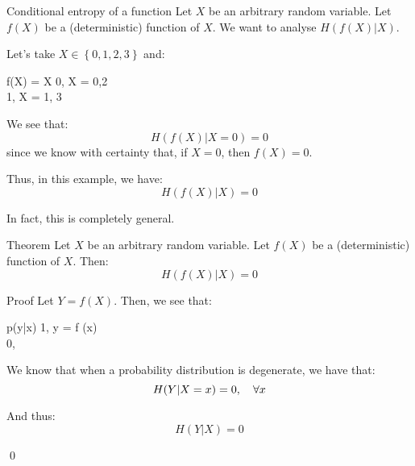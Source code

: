 \documentclass[a4paper]{article}
\begin{document}
\begin{parag}{Conditional entropy of a function}
    Let $X$ be an arbitrary random variable. Let $f\left(X\right)$ be a (deterministic) function of $X$. We want to analyse $H\left(f\left(X\right)|X\right)$.

    Let's take $X \in \left\{0, 1, 2, 3\right\}$ and: 
    \begin{functionbypart}{f\left(X\right) = X }
    0, \mathspace  {} X = 0,2 \\
    1, \mathspace {} X = 1, 3
    \end{functionbypart}

    We see that: 
    \[H\left(f\left(X\right) |X = 0\right) = 0\]
    since we know with certainty that, if $X = 0$, then $f\left(X\right) = 0$.

    Thus, in this example, we have: 
    \[H\left(f\left(X\right) | X\right) = 0\]

    In fact, this is completely general.
\end{parag}

\begin{parag}{Theorem}
    Let $X$ be an arbitrary random variable. Let $f\left(X\right)$ be a (deterministic) function of $X$. Then: 
    \[H\left(f\left(X\right) | X\right) = 0\]
    
    \begin{subparag}{Proof}
        Let $Y = f\left(X\right)$. Then, we see that:
        \begin{functionbypart}{p\left(y|x\right)}
            1, \mathspace {} y = f \left(x\right) \\
            0, \mathspace {}
        \end{functionbypart}

        We know that when a probability distribution is degenerate, we have that: 
        \[H\left(Y |X = x\right) = 0, \mathspace \forall x\]
        
        And thus: 
        \[H\left(Y | X\right) = 0\]
        
        \qed
    \end{subparag}
\end{parag}
\end{document}
